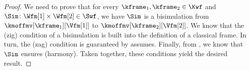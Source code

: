 \begin{proof}
    We need to prove that for every $\kframe_1, \kframe_2 \in \Kwf$ and $\Sim \colon {\Wfm[1] \times \Wfm[2]} \in \Swf$, we have $\Sim$ is a bisimulation from $\kmoffmv[\kframe_1][{\Vfm[1]}]$ to $\kmoffmv[\kframe_2][{\Vfm[2]}]$.
    We know that the (zig) condition of a bisimulation is built into the definition of a classical frame.
    In turn, the (zag) condition is guaranteed by assumes.
    Finally, from , we know that $\Sim$ ensures (harmony).
    Taken together, these conditions yield the desired result.
\end{proof}

